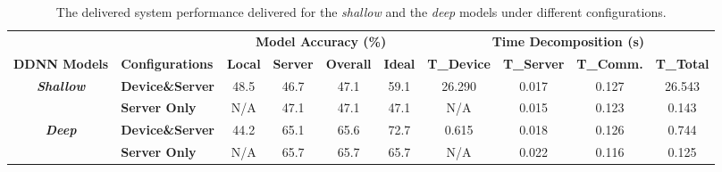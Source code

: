 \documentclass[conference]{IEEEtran}
\begin{document}
    \begin{table}[hbt]
    \centering
    \caption{The delivered system performance delivered for the \emph{shallow} and the \emph{deep} models under different configurations.}
    \label{tab:perfresults}
    \scriptsize{
    \begin{tabular}{cl|cccc|cccc}
                                      &                         & \multicolumn{4}{c|}{\textbf{Model Accuracy (\%)}}                    & \multicolumn{4}{c}{\textbf{Time Decomposition (s)}}                            \\
    \textbf{DDNN Models}              & \textbf{Configurations} & \textbf{Local} & \textbf{Server} & \textbf{Overall} & \textbf{Ideal} & \textbf{T\_Device} & \textbf{T\_Server} & \textbf{T\_Comm.} & \textbf{T\_Total} \\ \hline\hline
    \multirow{2}{*}{\textit{\textbf{Shallow}}} & \textbf{Device\&Server} & 48.5           & 46.7            & 47.1             & 59.1           & 26.290             & 0.017              & 0.127             & 26.543             \\ \cline{2-10}
                                      & \textbf{Server Only}    & N/A            & 47.1            & 47.1             & 47.1           & N/A                & 0.015              & 0.123             & 0.143             \\ \hline
    \multirow{2}{*}{\textit{\textbf{Deep}}}    & \textbf{Device\&Server} & 44.2           & 65.1            & 65.6             & 72.7           & 0.615              & 0.018              & 0.126             & 0.744             \\ \cline{2-10}
                                      & \textbf{Server Only}    & N/A            & 65.7            & 65.7             & 65.7           & N/A                & 0.022              & 0.116             & 0.125             \\ \cline{2-10}
    \end{tabular}

    }%

    \end{table}
\end{document}
